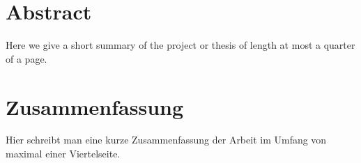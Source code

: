 \cleardoublepage

\section*{Abstract}
Here we give a short summary of the project or thesis of length at most a quarter of a page.


\section*{Zusammenfassung}
Hier schreibt man eine kurze Zusammenfassung der Arbeit im Umfang von maximal einer Viertelseite.


